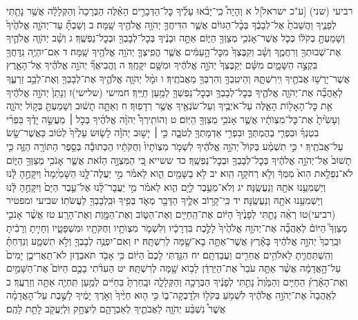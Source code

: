 \documentclass[twoside, openany, parskip=half, 11pt]{book}
\begin{document}
רביעי (שני) [ע"כ ישראל]ל א וְהָיָה֩ כִֽי־יָבֹ֨אוּ עָלֶ֜יךָ כׇּל־הַדְּבָרִ֣ים הָאֵ֗לֶּה הַבְּרָכָה֙ וְהַקְּלָלָ֔ה אֲשֶׁ֥ר נָתַ֖תִּי לְפָנֶ֑יךָ וַהֲשֵׁבֹתָ֙ אֶל־לְבָבֶ֔ךָ בְּכׇ֨ל־הַגּוֹיִ֔ם אֲשֶׁ֧ר הִדִּיחֲךָ֛ יְהֹוָ֥ה אֱלֹהֶ֖יךָ שָֽׁמָּה׃ ב וְשַׁבְתָּ֞ עַד־יְהֹוָ֤ה אֱלֹהֶ֙יךָ֙ וְשָׁמַעְתָּ֣ בְקֹל֔וֹ כְּכֹ֛ל אֲשֶׁר־אָנֹכִ֥י מְצַוְּךָ֖ הַיּ֑וֹם אַתָּ֣ה וּבָנֶ֔יךָ בְּכׇל־לְבָבְךָ֖ וּבְכׇל־נַפְשֶֽׁךָ׃ ג וְשָׁ֨ב יְהֹוָ֧ה אֱלֹהֶ֛יךָ אֶת־שְׁבוּתְךָ֖ וְרִחֲמֶ֑ךָ וְשָׁ֗ב וְקִבֶּצְךָ֙ מִכׇּל־הָ֣עַמִּ֔ים אֲשֶׁ֧ר הֱפִֽיצְךָ֛ יְהֹוָ֥ה אֱלֹהֶ֖יךָ שָֽׁמָּה׃ ד אִם־יִהְיֶ֥ה נִֽדַּחֲךָ֖ בִּקְצֵ֣ה הַשָּׁמָ֑יִם מִשָּׁ֗ם יְקַבֶּצְךָ֙ יְהֹוָ֣ה אֱלֹהֶ֔יךָ וּמִשָּׁ֖ם יִקָּחֶֽךָ׃ ה וֶהֱבִיאֲךָ֞ יְהֹוָ֣ה אֱלֹהֶ֗יךָ אֶל־הָאָ֛רֶץ אֲשֶׁר־יָרְשׁ֥וּ אֲבֹתֶ֖יךָ וִֽירִשְׁתָּ֑הּ וְהֵיטִֽבְךָ֥ וְהִרְבְּךָ֖ מֵאֲבֹתֶֽיךָ׃ ו וּמָ֨ל יְהֹוָ֧ה אֱלֹהֶ֛יךָ אֶת־לְבָבְךָ֖ וְאֶת־לְבַ֣ב זַרְעֶ֑ךָ לְאַהֲבָ֞ה אֶת־יְהֹוָ֧ה אֱלֹהֶ֛יךָ בְּכׇל־לְבָבְךָ֥ וּבְכׇל־נַפְשְׁךָ֖ לְמַ֥עַן חַיֶּֽיךָ׃ חמישי (שלישי)ז וְנָתַן֙ יְהֹוָ֣ה אֱלֹהֶ֔יךָ אֵ֥ת כׇּל־הָאָל֖וֹת הָאֵ֑לֶּה עַל־אֹיְבֶ֥יךָ וְעַל־שֹׂנְאֶ֖יךָ אֲשֶׁ֥ר רְדָפֽוּךָ׃ ח וְאַתָּ֣ה תָשׁ֔וּב וְשָׁמַעְתָּ֖ בְּק֣וֹל יְהֹוָ֑ה וְעָשִׂ֙יתָ֙ אֶת־כׇּל־מִצְוֺתָ֔יו אֲשֶׁ֛ר אָנֹכִ֥י מְצַוְּךָ֖ הַיּֽוֹם׃ ט וְהוֹתִֽירְךָ֩ יְהֹוָ֨ה אֱלֹהֶ֜יךָ בְּכֹ֣ל ׀ מַעֲשֵׂ֣ה יָדֶ֗ךָ בִּפְרִ֨י בִטְנְךָ֜ וּבִפְרִ֧י בְהֶמְתְּךָ֛ וּבִפְרִ֥י אַדְמָתְךָ֖ לְטֹבָ֑ה כִּ֣י ׀ יָשׁ֣וּב יְהֹוָ֗ה לָשׂ֤וּשׂ עָלֶ֙יךָ֙ לְט֔וֹב כַּאֲשֶׁר־שָׂ֖שׂ עַל־אֲבֹתֶֽיךָ׃ י כִּ֣י תִשְׁמַ֗ע בְּקוֹל֙ יְהֹוָ֣ה אֱלֹהֶ֔יךָ לִשְׁמֹ֤ר מִצְוֺתָיו֙ וְחֻקֹּתָ֔יו הַכְּתוּבָ֕ה בְּסֵ֥פֶר הַתּוֹרָ֖ה הַזֶּ֑ה כִּ֤י תָשׁוּב֙ אֶל־יְהֹוָ֣ה אֱלֹהֶ֔יךָ בְּכׇל־לְבָבְךָ֖ וּבְכׇל־נַפְשֶֽׁךָ׃
כד ששייא כִּ֚י הַמִּצְוָ֣ה הַזֹּ֔את אֲשֶׁ֛ר אָנֹכִ֥י מְצַוְּךָ֖ הַיּ֑וֹם לֹא־נִפְלֵ֥את הִוא֙ מִמְּךָ֔ וְלֹ֥א רְחֹקָ֖ה הִֽוא׃ יב לֹ֥א בַשָּׁמַ֖יִם הִ֑וא לֵאמֹ֗ר מִ֣י יַעֲלֶה־לָּ֤נוּ הַשָּׁמַ֙יְמָה֙ וְיִקָּחֶ֣הָ לָּ֔נוּ וְיַשְׁמִעֵ֥נוּ אֹתָ֖הּ וְנַעֲשֶֽׂנָּה׃ יג וְלֹא־מֵעֵ֥בֶר לַיָּ֖ם הִ֑וא לֵאמֹ֗ר מִ֣י יַעֲבׇר־לָ֜נוּ אֶל־עֵ֤בֶר הַיָּם֙ וְיִקָּחֶ֣הָ לָּ֔נוּ וְיַשְׁמִעֵ֥נוּ אֹתָ֖הּ וְנַעֲשֶֽׂנָּה׃ יד כִּֽי־קָר֥וֹב אֵלֶ֛יךָ הַדָּבָ֖ר מְאֹ֑ד בְּפִ֥יךָ וּבִֽלְבָבְךָ֖ לַעֲשֹׂתֽוֹ׃
שביעי ומפטיר (רביעי)טו רְאֵ֨ה נָתַ֤תִּי לְפָנֶ֙יךָ֙ הַיּ֔וֹם אֶת־הַֽחַיִּ֖ים וְאֶת־הַטּ֑וֹב וְאֶת־הַמָּ֖וֶת וְאֶת־הָרָֽע׃ טז אֲשֶׁ֨ר אָנֹכִ֣י מְצַוְּךָ֮ הַיּוֹם֒ לְאַהֲבָ֞ה אֶת־יְהֹוָ֤ה אֱלֹהֶ֙יךָ֙ לָלֶ֣כֶת בִּדְרָכָ֔יו וְלִשְׁמֹ֛ר מִצְוֺתָ֥יו וְחֻקֹּתָ֖יו וּמִשְׁפָּטָ֑יו וְחָיִ֣יתָ וְרָבִ֔יתָ וּבֵֽרַכְךָ֙ יְהֹוָ֣ה אֱלֹהֶ֔יךָ בָּאָ֕רֶץ אֲשֶׁר־אַתָּ֥ה בָא־שָׁ֖מָּה לְרִשְׁתָּֽהּ׃ יז וְאִם־יִפְנֶ֥ה לְבָבְךָ֖ וְלֹ֣א תִשְׁמָ֑ע וְנִדַּחְתָּ֗ וְהִֽשְׁתַּחֲוִ֛יתָ לֵאלֹהִ֥ים אֲחֵרִ֖ים וַעֲבַדְתָּֽם׃ יח הִגַּ֤דְתִּי לָכֶם֙ הַיּ֔וֹם כִּ֥י אָבֹ֖ד תֹּאבֵד֑וּן לֹא־תַאֲרִיכֻ֤ן יָמִים֙ עַל־הָ֣אֲדָמָ֔ה אֲשֶׁ֨ר אַתָּ֤ה עֹבֵר֙ אֶת־הַיַּרְדֵּ֔ן לָב֥וֹא שָׁ֖מָּה לְרִשְׁתָּֽהּ׃ יט הַעִדֹ֨תִי בָכֶ֣ם הַיּוֹם֮ אֶת־הַשָּׁמַ֣יִם וְאֶת־הָאָ֒רֶץ֒ הַחַיִּ֤ים וְהַמָּ֙וֶת֙ נָתַ֣תִּי לְפָנֶ֔יךָ הַבְּרָכָ֖ה וְהַקְּלָלָ֑ה וּבָֽחַרְתָּ֙ בַּחַיִּ֔ים לְמַ֥עַן תִּֽחְיֶ֖ה אַתָּ֥ה וְזַרְעֶֽךָ׃ כ לְאַֽהֲבָה֙ אֶת־יְהֹוָ֣ה אֱלֹהֶ֔יךָ לִשְׁמֹ֥עַ בְּקֹל֖וֹ וּלְדׇבְקָה־ב֑וֹ כִּ֣י ה֤וּא חַיֶּ֙יךָ֙ וְאֹ֣רֶךְ יָמֶ֔יךָ לָשֶׁ֣בֶת עַל־הָאֲדָמָ֗ה אֲשֶׁר֩ נִשְׁבַּ֨ע יְהֹוָ֧ה לַאֲבֹתֶ֛יךָ לְאַבְרָהָ֛ם לְיִצְחָ֥ק וּֽלְיַעֲקֹ֖ב לָתֵ֥ת לָהֶֽם׃
\end{document}
